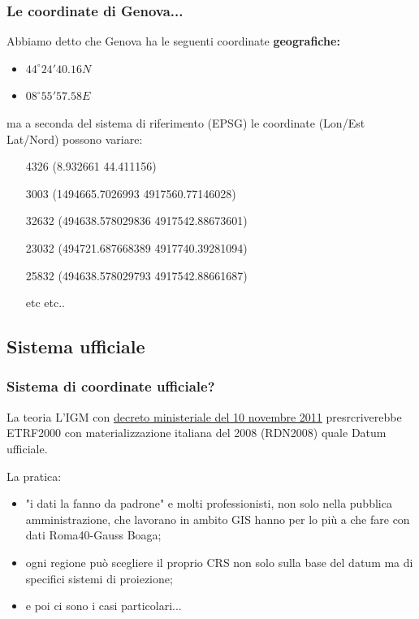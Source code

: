 \documentclass{beamer}
\begin{document}
{\begin{frame}
   \frametitle{Le coordinate di Genova...}
  Abbiamo detto che Genova ha le seguenti coordinate \textbf{geografiche:}
			\begin{itemize}
				\item $ 44^{\circ} 24' 40.16 N $
				\item $ 08^{\circ} 55' 57.58 E $
			\end{itemize}
 ma a seconda del sistema di riferimento (EPSG) le coordinate (Lon/Est Lat/Nord) possono variare:
\begin{center} 
 \begin{itemize}
 	\item[4326] (8.932661 44.411156)
 	\item[3003] (1494665.7026993 4917560.77146028)
 	\item[32632] (494638.578029836 4917542.88673601)
 	\item[23032] (494721.687668389 4917740.39281094)
 	\item[25832] (494638.578029793 4917542.88661687)
 	\item[etc etc..]
  \end{itemize} 
\end{center}
\end{frame}

\subsection{Sistema ufficiale}
\begin{frame}
	\frametitle{Sistema di coordinate ufficiale?}

    \begin{block}{La teoria}
        L'IGM con \href{https://www.gazzettaufficiale.it/eli/id/2012/02/27/12A01799/sg}{decreto ministeriale del 10 novembre 2011} presrcriverebbe ETRF2000 con materializzazione italiana del 2008 (RDN2008) quale Datum ufficiale.
    \end{block}

    La pratica: 
	\begin{itemize}
        \item "i dati la fanno da padrone" e molti professionisti, non solo
        nella pubblica amministrazione, che lavorano in ambito GIS hanno
        per lo più a che fare con dati Roma40-Gauss Boaga;
		\item ogni regione può scegliere il proprio CRS non solo sulla
        base del datum ma di specifici sistemi di proiezione;
		\item e poi ci sono i casi particolari... 
	\end{itemize}


\end{frame}}
\end{document}
